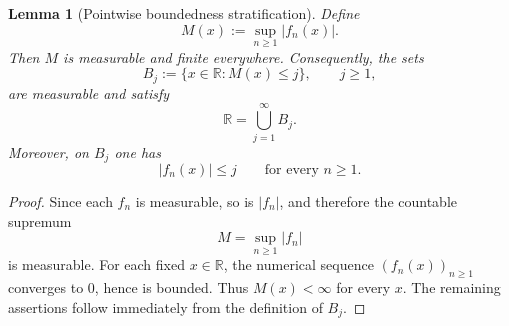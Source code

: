 \documentclass[11pt]{article}
\newcommand{\R}{\mathbb{R}}
\theoremstyle{plain}
\newtheorem{lemma}[theorem]{Lemma}
\theoremstyle{definition}
\theoremstyle{remark}
\begin{document}
\begin{lemma}[Pointwise boundedness stratification]\label{lem:boundedness-pieces}
Define
\[
        M(x):=\sup_{n\geq 1}|f_n(x)|.
\]
Then $M$ is measurable and finite everywhere.  Consequently, the sets
\[
        B_j:=\{x\in\R:M(x)\leq j\},\qquad j\geq 1,
\]
are measurable and satisfy
\[
        \R=\bigcup_{j=1}^\infty B_j.
\]
Moreover, on $B_j$ one has
\[
        |f_n(x)|\leq j
        \qquad\text{for every }n\geq 1.
\]
\end{lemma}

\begin{proof}
Since each $f_n$ is measurable, so is $|f_n|$, and therefore the countable
supremum
\[
        M=\sup_{n\geq 1}|f_n|
\]
is measurable.  For each fixed $x\in\R$, the numerical sequence
$(f_n(x))_{n\geq 1}$ converges to $0$, hence is bounded.  Thus $M(x)<\infty$
for every $x$.  The remaining assertions follow immediately from the
definition of $B_j$.
\end{proof}
\end{document}
